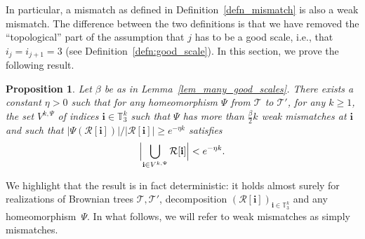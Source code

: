 \documentclass[11pt]{article}
\newcommand{\ie}{i.e.,\xspace}
\newcommand{\bsfrac}[2]{{#1}\big/{#2}}
\newcommand{\Tt}{\mathcal{T}}
\newcommand{\Rr}{\mathcal{R}}
\newcommand{\ii}{\mathbf{i}}
\theoremstyle{plain}
\newtheorem{proposition}[theorem]{Proposition}
\theoremstyle{definition}
\numberwithin{equation}{section}
\begin{document}
In particular, a mismatch as defined in Definition~\ref{defn_mismatch} is also a weak mismatch.
The difference between the two definitions is that we have removed the ``topological'' part of the assumption that $j$ has to be a good scale, \ie that $i_j=i_{j+1}=3$ (see Definition~\ref{defn:good_scale}).
In this section, we prove the following result.
\begin{proposition}\label{prop:mass of bad regions is small}
Let $\beta$ be as in Lemma~\ref{lem_many_good_scales}.
There exists a constant $\eta>0$ such that for any homeomorphism $\Psi$ from $\Tt$ to $\Tt'$, for any $k\geq 1$, the set $V^{k,\Psi}$ of indices $\ii \in \mathbb{T}_3^k$ such that $\Psi$ has more than $\frac{\beta}{2} k$ weak mismatches at $\ii$ and such that $\bsfrac{\left| \Psi \left( \Rr[\ii] \right) \right|}{\left| \Rr[\ii] \right|} \geq e^{-\eta k}$ satisfies\vspace*{-3pt}
\begin{align*}
\Bigl|\bigcup_{\ii \in V^{k,\Psi}}\Rr[\ii]\Bigr| < e^{-\eta k}.
\end{align*}
\end{proposition}
We highlight that the result is in fact deterministic: it holds almost surely for realizations of Brownian trees $\Tt, \Tt'$, decomposition $(\Rr[\ii])_{\ii\in \mathbb{T}_3^k}$ and any homeomorphism~$\Psi$.
In what follows, we will refer to weak mismatches as simply mismatches.
\end{document}

